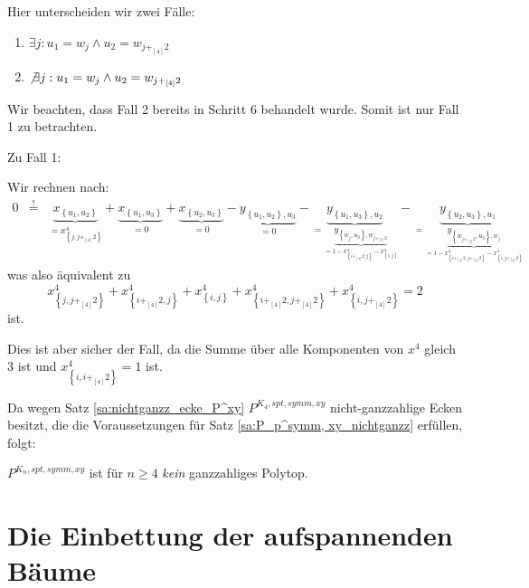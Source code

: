 \documentclass[10p,a4paper,BCOR = 12mm, DIV=15]{scrbook}
\begin{document}
{\begin{bew}
Hier unterscheiden wir zwei Fälle:
\begin{enumerate}
\item $\exists j: u_1 = w_j \wedge u_2 = w_{j +_{\left[4\right]} 2}$
\item $\not\exists j: u_1 = w_j \wedge u_2 = w_{j +_{\left[4\right]} 2}$
\end{enumerate}

Wir beachten, dass Fall 2 bereits in Schritt 6 behandelt wurde. Somit ist nur Fall 1 zu betrachten.

Zu Fall 1:

Wir rechnen nach:
\begin{eqnarray*}
0 & \stackrel{!}{=} & \underbrace{x_{\left\{u_1, u_2\right\}}}_{= x^{4}_{\left\{j, j +_{\left[4\right]} 2\right\}}} + \underbrace{x_{\left\{u_1, u_3\right\}}}_{= 0} + \underbrace{x_{\left\{u_2, u_3\right\}}}_{= 0} - \underbrace{y_{\left\{u_1, u_2\right\}, u_3}}_{= 0} - \underbrace{y_{\left\{u_1, u_3\right\}, u_2}}_{= \underbrace{y_{\left\{w_j, u_3\right\}, w_{j +_{\left[4\right]} 2}}}_{= 1 - x^{4}_{\left\{i+_{\left[4\right]} 2, j\right\}} - x^{4}_{\left\{i, j\right\}}}}  - \underbrace{y_{\left\{u_2, u_3\right\}, u_1}}_{= \underbrace{y_{\left\{w_{j +_{\left[4\right]} 2}, u_3\right\}, w_j}}_{= 1 - x^{4}_{\left\{i+_{\left[4\right]} 2, j +_{\left[4\right]} 2\right\}} - x^{4}_{\left\{i, j +_{\left[4\right]} 2\right\}}}}
\end{eqnarray*}
was also äquivalent zu
\begin{displaymath}
x^{4}_{\left\{j, j +_{\left[4\right]} 2\right\}} + x^{4}_{\left\{i+_{\left[4\right]} 2, j\right\}} + x^{4}_{\left\{i, j\right\}} + x^{4}_{\left\{i+_{\left[4\right]} 2, j +_{\left[4\right]} 2\right\}} + x^{4}_{\left\{i, j +_{\left[4\right]} 2\right\}} = 2
\end{displaymath}
ist.

Dies ist aber sicher der Fall, da die Summe über alle Komponenten von $x^{4}$ gleich 3 ist und $x^{4}_{\left\{i, i +_{\left[4\right]} 2\right\}} = 1$ ist.
\end{bew}

Da wegen Satz \ref{sa:nichtganzz_ecke_P^xy} $P^{K_4, spt, symm, xy}$ nicht-ganzzahlige Ecken besitzt, die die Voraussetzungen für Satz \ref{sa:P_p^symm, xy_nichtganzz} erfüllen, folgt:

\begin{Kor}
$P^{K_n, spt, symm, xy}$ ist für $n\geq 4$ \emph{kein} ganzzahliges Polytop.
\end{Kor}

\chapter{Die Einbettung der aufspannenden Bäume}

}
\end{document}
